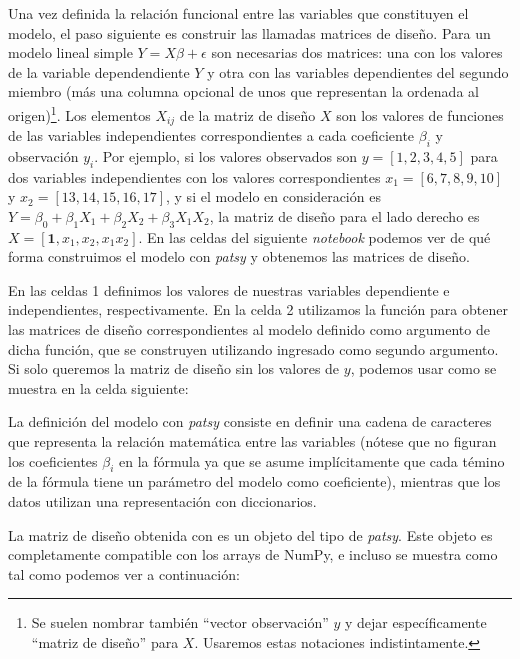 Una vez definida la relación funcional entre las variables que constituyen el modelo, el paso siguiente es construir las llamadas matrices de diseño. Para un modelo lineal simple $Y = X \beta + \epsilon$ son necesarias dos matrices: una con los valores de la variable dependendiente $Y$ y otra con las variables dependientes del segundo miembro (más una columna opcional de unos que representan la ordenada al origen)\footnote{Se suelen nombrar también ``vector observación'' $y$ y dejar específicamente ``matriz de diseño'' para $X$. Usaremos estas notaciones indistintamente.}.
Los elementos $X_{ij}$ de la matriz de diseño $X$ son los valores de funciones de las variables independientes correspondientes a cada coeficiente $\beta_i$ y observación $y_i$. Por ejemplo, si los valores observados son $y = [ 1, 2, 3, 4, 5 ]$ para dos variables independientes con los valores correspondientes $x_1 = [6, 7, 8, 9, 10 ]$ y $x_2 = [13, 14, 15, 16, 17 ]$, y si el modelo en consideración es $Y = \beta_0 + \beta_1 X_1 + \beta_2 X_2 + \beta_3 X_1 X_2$, la matriz de diseño para el lado derecho es $X = [\bm{1}, x_1, x_2, x_1 x_2]$. En las celdas del siguiente \textit{notebook} podemos ver de qué forma construimos el modelo con \textit{patsy} y obtenemos las matrices de diseño.


En las celdas 1 definimos los valores de nuestras variables dependiente e independientes, respectivamente. En la celda 2 utilizamos la función  para obtener las matrices de diseño correspondientes al modelo definido como argumento de dicha función, que se construyen utilizando  ingresado como segundo argumento. Si solo queremos la matriz de diseño sin los valores de $y$, podemos usar  como se muestra en la celda siguiente:


La definición del modelo con \textit{patsy} consiste en definir una cadena de caracteres que representa la relación matemática entre las variables (nótese que no figuran los coeficientes $\beta_i$ en la fórmula ya que se asume implícitamente que cada témino de la fórmula tiene un parámetro del modelo como coeficiente), mientras que los datos utilizan una representación con diccionarios.

La matriz de diseño obtenida con  es un objeto del tipo  de \textit{patsy}. Este objeto es completamente compatible con los arrays de NumPy, e incluso se muestra como tal como podemos ver a continuación:

